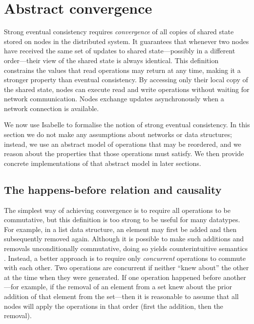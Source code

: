 \section{Abstract convergence}
\label{sect.abstract.convergence}

Strong eventual consistency requires \emph{convergence} of all copies of shared state stored on nodes in the distributed system.
It guarantees that whenever two nodes have received the same set of updates to shared state---possibly in a different order---their view of the shared state is always identical.
This definition constrains the values that read operations may return at any time, making it a stronger property than eventual consistency.
By accessing only their local copy of the shared state, nodes can execute read and write operations without waiting for network communication.
Nodes exchange updates asynchronously when a network connection is available.  

We now use Isabelle to formalise the notion of strong eventual consistency.
In this section we do not make any assumptions about networks or data structures; instead, we use an abstract model of operations that may be reordered, and we reason about the properties that those operations must satisfy.
We then provide concrete implementations of that abstract model in later sections.

\subsection{The happens-before relation and causality}\label{sect.happens.before}

The simplest way of achieving convergence is to require all operations to be commutative, but this definition is too strong to be useful for many datatypes.
For example, in a list data structure, an element may first be added and then subsequently removed again.
Although it is possible to make such additions and removals unconditionally commutative, doing so yields counterintuitive semantics \cite{Bieniusa:2012wu,Bieniusa:2012gt}.
Instead, a better approach is to require only \emph{concurrent} operations to commute with each other.
Two operations are concurrent if neither ``knew about'' the other at the time when they were generated.
If one operation happened before another---for example, if the removal of an element from a set knew about the prior addition of that element from the set---then it is reasonable to assume that all nodes will apply the operations in that order (first the addition, then the removal).

